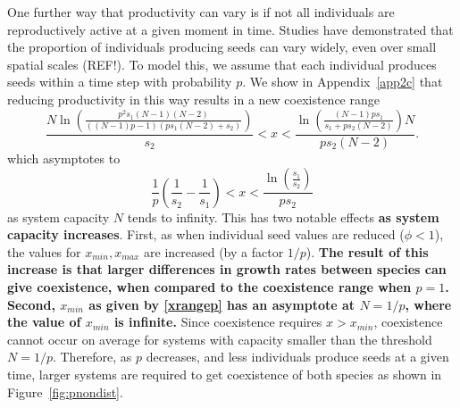 One further way that productivity can vary is if not all individuals are reproductively active at a given moment in time. Studies have demonstrated that the proportion of individuals producing seeds can vary widely, even over small spatial scales (REF!). To model this, we assume that each individual produces seeds within a time step with probability $p$. We show in Appendix~\ref{app2c} that reducing productivity in this way results in a new coexistence range
\begin{equation}
\label{xrangep}
\frac{N\ln \left( \frac{p^2 s_1(N-1)(N-2)}{((N-1)p-1)(ps_1(N-2)+s_2)} \right)}{s_2}<x<\frac{\ln \left( \frac{(N-1)ps_1}{s_1+ps_2(N-2)}\right) N}{ps_2(N-2)}.
\end{equation}
which asymptotes to
\begin{equation}
\frac{1}{p}\left(\frac{1}{s_2}-\frac{1}{s_1}\right)<x<\frac{\ln\left(\frac{s_1}{s_2}\right)}{ps_2}
\end{equation}
as system capacity $N$ tends to infinity. This has two notable effects \textbf{as system capacity increases}. First, as when individual seed values are reduced ($\phi<1$), the values for $x_{min},x_{max}$ are increased (by a factor $1/p$). \textbf{The result of this increase is that larger differences in growth rates between species can give coexistence, when compared to the coexistence range when $p=1$. Second, $x_{min}$ as given by \eqref{xrangep} has an asymptote at $N=1/p$, where the value of $x_{min}$ is infinite.} Since coexistence requires $x>x_{min}$, coexistence cannot occur on average for systems with capacity smaller than the threshold $N=1/p$. Therefore, as $p$ decreases, and less individuals produce seeds at a given time, larger systems are required to get coexistence of both species as shown in Figure~\ref{fig:pnondist}.  
